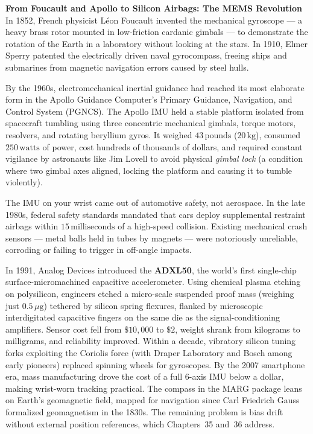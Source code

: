 \begin{historybox}
\textbf{From Foucault and Apollo to Silicon Airbags: The MEMS Revolution}
In 1852, French physicist L\'eon Foucault invented the mechanical gyroscope --- a heavy brass rotor mounted in low-friction cardanic gimbals --- to demonstrate the rotation of the Earth in a laboratory without looking at the stars. In 1910, Elmer Sperry patented the electrically driven naval gyrocompass, freeing ships and submarines from magnetic navigation errors caused by steel hulls.

By the 1960s, electromechanical inertial guidance had reached its most elaborate form in the Apollo Guidance Computer's Primary Guidance, Navigation, and Control System (PGNCS). The Apollo IMU held a stable platform isolated from spacecraft tumbling using three concentric mechanical gimbals, torque motors, resolvers, and rotating beryllium gyros. It weighed $43\,\text{pounds}$ ($20\,\text{kg}$), consumed $250\,\text{watts}$ of power, cost hundreds of thousands of dollars, and required constant vigilance by astronauts like Jim Lovell to avoid physical \emph{gimbal lock} (a condition where two gimbal axes aligned, locking the platform and causing it to tumble violently).

The IMU on your wrist came out of automotive safety, not aerospace. In the late 1980s, federal safety standards mandated that cars deploy supplemental restraint airbags within $15\,\text{milliseconds}$ of a high-speed collision. Existing mechanical crash sensors --- metal balls held in tubes by magnets --- were notoriously unreliable, corroding or failing to trigger in off-angle impacts. 

In 1991, Analog Devices introduced the \textbf{ADXL50}, the world's first single-chip surface-micromachined capacitive accelerometer. Using chemical plasma etching on polysilicon, engineers etched a micro-scale suspended proof mass (weighing just $0.5\,\mu\text{g}$) tethered by silicon spring flexures, flanked by microscopic interdigitated capacitive fingers on the same die as the signal-conditioning amplifiers. Sensor cost fell from $\$10,000$ to $\$2$, weight shrank from kilograms to milligrams, and reliability improved. Within a decade, vibratory silicon tuning forks exploiting the Coriolis force (with Draper Laboratory and Bosch among early pioneers) replaced spinning wheels for gyroscopes. By the 2007 smartphone era, mass manufacturing drove the cost of a full 6-axis IMU below a dollar, making wrist-worn tracking practical. The compass in the MARG package leans on Earth's geomagnetic field, mapped for navigation since Carl Friedrich Gauss formalized geomagnetism in the 1830s. The remaining problem is bias drift without external position references, which Chapters~35 and~36 address.
\end{historybox}

